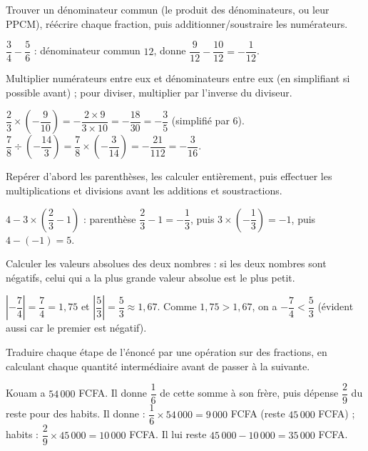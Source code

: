 Trouver un dénominateur commun (le produit des dénominateurs, ou leur PPCM), réécrire chaque
fraction, puis additionner/soustraire les numérateurs.
\begin{exemple}
$\dfrac34-\dfrac56$ : dénominateur commun $12$, donne $\dfrac9{12}-\dfrac{10}{12}=-\dfrac1{12}$.
\end{exemple}

Multiplier numérateurs entre eux et dénominateurs entre eux (en simplifiant si possible
avant) ; pour diviser, multiplier par l'inverse du diviseur.
\begin{exemple}
$\dfrac23\times\left(-\dfrac9{10}\right)=-\dfrac{2\times9}{3\times10}=-\dfrac{18}{30}=-\dfrac35$
(simplifié par $6$). \quad $\dfrac78\div\left(-\dfrac{14}3\right)=\dfrac78\times\left(-\dfrac3{14}\right)=-\dfrac{21}{112}=-\dfrac3{16}$.
\end{exemple}

Repérer d'abord les parenthèses, les calculer entièrement, puis effectuer les multiplications
et divisions avant les additions et soustractions.
\begin{exemple}
$4-3\times\left(\dfrac23-1\right)$ : parenthèse $\dfrac23-1=-\dfrac13$, puis
$3\times\left(-\dfrac13\right)=-1$, puis $4-(-1)=5$.
\end{exemple}

Calculer les valeurs absolues des deux nombres : si les deux nombres sont négatifs, celui qui
a la plus grande valeur absolue est le plus petit.
\begin{exemple}
$\left|-\dfrac74\right|=\dfrac74=1{,}75$ et $\left|\dfrac53\right|=\dfrac53\approx1{,}67$.
Comme $1{,}75>1{,}67$, on a $-\dfrac74<\dfrac53$ (évident aussi car le premier est négatif).
\end{exemple}

Traduire chaque étape de l'énoncé par une opération sur des fractions, en calculant chaque
quantité intermédiaire avant de passer à la suivante.
\begin{exemple}
Kouam a $54\,000$ FCFA. Il donne $\dfrac16$ de cette somme à son frère, puis dépense
$\dfrac29$ du reste pour des habits. Il donne : $\dfrac16\times54\,000=9\,000$ FCFA (reste
$45\,000$ FCFA) ; habits : $\dfrac29\times45\,000=10\,000$ FCFA. Il lui reste
$45\,000-10\,000=35\,000$ FCFA.
\end{exemple}

